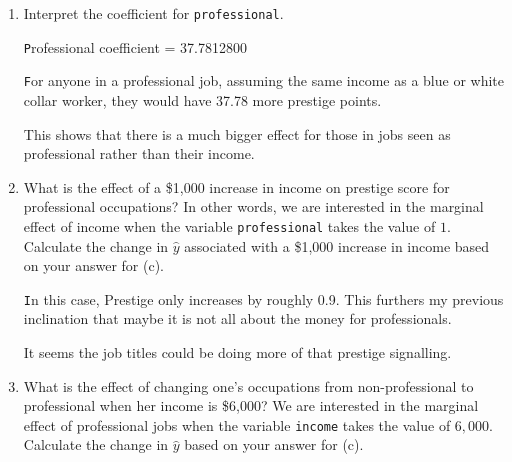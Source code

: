 \documentclass[12pt,letterpaper]{article}
\begin{document}
\begin{enumerate}
	\item [(e)]
	Interpret the coefficient for \texttt{professional}.
	
		\vspace{0.5cm}
	
	\texttt  Professional coefficient = 37.7812800  
	
	\vspace{0.5cm}
	
	\texttt  For anyone in a professional job, assuming the same income as a blue or white collar worker, they would have 37.78 more prestige points.
	
	This shows that there is a much bigger effect for those in jobs
	seen as professional rather than their income.
	
	\vspace{0.5cm}
	
	\newpage
	\item [(f)]
	What is the effect of a \$1,000 increase in income on prestige score for professional occupations? In other words, we are interested in the marginal effect of income when the variable \texttt{professional} takes the value of $1$. Calculate the change in $\hat{y}$ associated with a \$1,000 increase in income based on your answer for (c).
	
	\vspace{0.5cm}
	  
	\vspace{0.5cm}
	
	\vspace{0.5cm}
	
	\texttt In this case, Prestige only increases by roughly 0.9.
	This furthers my previous inclination that maybe it is not all about the money for professionals.
	
	It seems the job titles could be doing more of that prestige signalling.
	
	\vspace{0.5cm}
	
	
	\item [(g)]
	What is the effect of changing one's occupations from non-professional to professional when her income is \$6,000? We are interested in the marginal effect of professional jobs when the variable \texttt{income} takes the value of $6,000$. Calculate the change in $\hat{y}$ based on your answer for (c).
	
	\vspace{0.5cm}
	  
	\vspace{0.5cm}
	

\end{enumerate}
\end{document}
